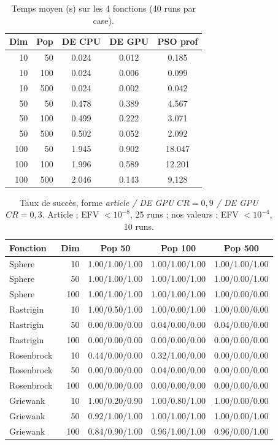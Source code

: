 \begin{table}[!t]\centering\scriptsize\setlength{\tabcolsep}{2pt}\caption{Temps moyen (s) sur les 4 fonctions (40 runs par case).}\label{tab:temps}
\begin{tabular}{rr|ccc}\toprule Dim & Pop & DE CPU & DE GPU & PSO prof\\\midrule
10 & 50 & 0.024 & 0.012 & 0.185\\
10 & 100 & 0.024 & 0.006 & 0.099\\
10 & 500 & 0.024 & 0.002 & 0.042\\
\midrule
50 & 50 & 0.478 & 0.389 & 4.567\\
50 & 100 & 0.499 & 0.222 & 3.071\\
50 & 500 & 0.502 & 0.052 & 2.092\\
\midrule
100 & 50 & 1.945 & 0.902 & 18.047\\
100 & 100 & 1.996 & 0.589 & 12.201\\
100 & 500 & 2.046 & 0.143 & 9.128\\
\bottomrule\end{tabular}\end{table}

\begin{table}[!t]\centering\scriptsize\setlength{\tabcolsep}{2pt}\caption{Taux de succ\`es, forme \emph{article / DE GPU $CR{=}0{,}9$ / DE GPU $CR{=}0{,}3$}. Article \cite{qin} : EFV $<10^{-8}$, 25 runs ; nos valeurs : EFV $<10^{-4}$, 10 runs.}\label{tab:sr}
\begin{tabular}{lr|ccc}\toprule Fonction & Dim & Pop 50 & Pop 100 & Pop 500\\\midrule
Sphere & 10 & 1.00/1.00/1.00 & 1.00/1.00/1.00 & 1.00/1.00/1.00\\
Sphere & 50 & 1.00/1.00/1.00 & 1.00/1.00/1.00 & 1.00/0.00/1.00\\
Sphere & 100 & 1.00/1.00/1.00 & 1.00/1.00/1.00 & 1.00/0.00/0.00\\
Rastrigin & 10 & 1.00/0.50/1.00 & 1.00/0.00/1.00 & 1.00/0.00/0.00\\
Rastrigin & 50 & 0.00/0.00/0.00 & 0.04/0.00/0.00 & 0.04/0.00/0.00\\
Rastrigin & 100 & 0.00/0.00/0.00 & 0.00/0.00/0.00 & 0.00/0.00/0.00\\
Rosenbrock & 10 & 0.44/0.00/0.00 & 0.32/1.00/0.00 & 0.00/0.00/0.00\\
Rosenbrock & 50 & 0.00/0.00/0.00 & 0.04/0.00/0.00 & 0.00/0.00/0.00\\
Rosenbrock & 100 & 0.00/0.00/0.00 & 0.00/0.00/0.00 & 0.00/0.00/0.00\\
Griewank & 10 & 1.00/0.20/0.90 & 1.00/0.80/1.00 & 1.00/0.00/0.00\\
Griewank & 50 & 0.92/1.00/1.00 & 1.00/1.00/1.00 & 1.00/0.00/1.00\\
Griewank & 100 & 0.84/0.90/1.00 & 0.96/1.00/1.00 & 0.96/0.00/1.00\\
\bottomrule\end{tabular}\end{table}
